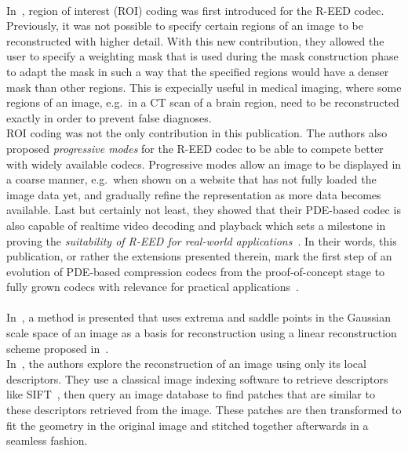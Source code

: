 \\
In~\cite{peter15}, region of interest (ROI) coding was first introduced for the R-EED codec. Previously,
it was not possible to specify certain regions of an image to be reconstructed with higher detail.
With this new contribution, they allowed the user to specify a weighting mask that is used during
the mask construction phase to adapt the mask in such a way that the specified regions would have a
denser mask than other regions. This is expecially useful in medical imaging, where some regions of
an image, e.g.\ in a CT scan of a brain region, need to be reconstructed exactly in order to prevent
false diagnoses. \\
ROI coding was not the only contribution in this publication. The authors also proposed
\textit{progressive modes} for the R-EED codec to be able to compete better with widely available codecs.
Progressive modes allow an image to be displayed in a coarse manner, e.g.\ when shown on a website
that has not fully loaded the image data yet, and gradually refine the representation as more data
becomes available. Last but certainly not least, they showed that their PDE-based codec is also
capable of realtime video decoding and playback which sets a milestone in proving the
\textit{suitability of R-EED for real-world applications}~\cite{peter15}. In their words, this
publication, or rather the extensions presented therein, mark the first step of an evolution of
PDE-based compression codecs from the proof-of-concept stage to fully grown codecs with relevance
for practical applications~\cite{peter15}.\\
\\
In~\cite{kanters05}, a method is presented that uses extrema and saddle points in the Gaussian
scale space of an image as a basis for reconstruction using a linear reconstruction scheme proposed
in~\cite{janssen05}.\\
In~\cite{weinzaepfel11}, the authors explore the reconstruction of an image using only its local
descriptors. They use a classical image indexing software to retrieve descriptors like
SIFT~\cite{sift}, then query an image database to find patches that are similar to these descriptors
retrieved from the image. These patches are then transformed to fit the geometry in the original
image and stitched together afterwards in a seamless fashion.

